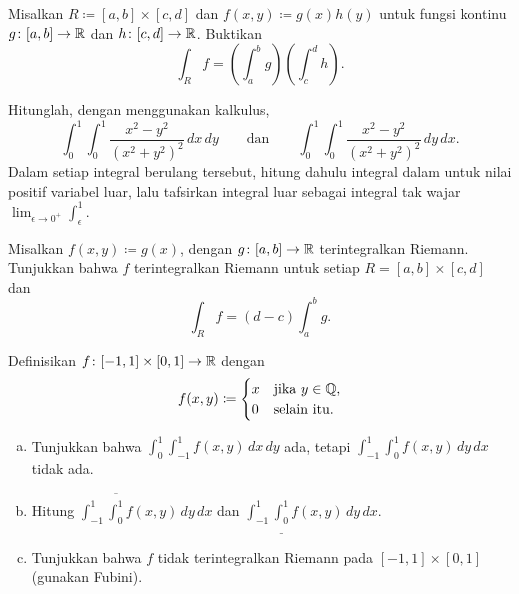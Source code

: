 \begin{exercise}
Misalkan $R \coloneqq [a,b] \times [c,d]$ dan
$f(x,y) \coloneqq g(x)h(y)$ untuk fungsi kontinu
$g \colon [a,b] \to {\mathbb{R}}$ dan $h \colon [c,d] \to {\mathbb{R}}$. Buktikan
\begin{equation*}
\int_R f = \left(\int_a^b g\right)\left(\int_c^d h\right) .
\end{equation*}
\end{exercise}

\begin{exercise}
Hitunglah, dengan menggunakan kalkulus,
\begin{equation*}
\int_0^1 \int_0^1 \frac{x^2-y^2}{{(x^2+y^2)}^2} \, dx \, dy
\qquad \text{dan} \qquad
\int_0^1 \int_0^1 \frac{x^2-y^2}{{(x^2+y^2)}^2} \, dy \, dx .
\end{equation*}
Dalam setiap integral berulang tersebut, hitung dahulu integral dalam untuk
nilai positif variabel luar, lalu tafsirkan integral luar sebagai integral tak
wajar $\lim_{\epsilon \to 0^+}\int_\epsilon^1$.
\end{exercise}

\begin{exercise}
Misalkan $f(x,y) \coloneqq g(x)$, dengan $g \colon [a,b] \to {\mathbb{R}}$ terintegralkan
Riemann. Tunjukkan bahwa $f$ terintegralkan Riemann untuk setiap
$R = [a,b] \times [c,d]$ dan
\begin{equation*}
\int_R f = (d-c) \int_a^b g .
\end{equation*}
\end{exercise}

\begin{exercise}
Definisikan $f \colon [-1,1] \times [0,1] \to {\mathbb{R}}$ dengan
\begin{equation*}
f(x,y) \coloneqq
\begin{cases}
x & \text{jika } y \in {\mathbb{Q}}, \\
0 & \text{selain itu.} 
\end{cases}
\end{equation*}
\begin{enumerate}[a)]
\item
Tunjukkan bahwa
$\int_0^1 \int_{-1}^1 f(x,y) \, dx \, dy$ ada, tetapi
$\int_{-1}^1 \int_0^1 f(x,y) \, dy \, dx$ tidak ada.
\item
Hitung
$\int_{-1}^1 \overline{\int_0^1} f(x,y) \, dy \, dx$ dan
$\int_{-1}^1 \underline{\int_0^1} f(x,y) \, dy \, dx$.
\item
Tunjukkan bahwa $f$ tidak terintegralkan Riemann pada $[-1,1] \times [0,1]$
(gunakan Fubini).
\end{enumerate}
\end{exercise}

